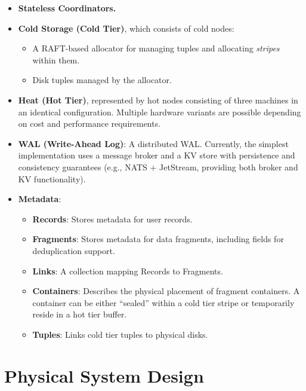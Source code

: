 \documentclass[a4paper,12pt]{article}
\begin{document}
    \begin{itemize}
        \item \textbf{Stateless Coordinators.}

        \item \textbf{Cold Storage (Cold Tier)}, which consists of cold nodes:
        \begin{itemize}
            \item A RAFT-based allocator for managing tuples and allocating \textit{stripes} within them.
            \item Disk tuples managed by the allocator.
        \end{itemize}

        \item \textbf{Heat (Hot Tier)}, represented by hot nodes consisting of three machines in an identical configuration. Multiple hardware variants are possible depending on cost and performance requirements.

        \item \textbf{WAL (Write-Ahead Log)}: A distributed WAL. Currently, the simplest implementation uses a message broker and a KV store with persistence and consistency guarantees (e.g., NATS + JetStream, providing both broker and KV functionality).

        \item \textbf{Metadata}:
        \begin{itemize}
            \item \textbf{Records}: Stores metadata for user records.
            \item \textbf{Fragments}: Stores metadata for data fragments, including fields for deduplication support.
            \item \textbf{Links}: A collection mapping Records to Fragments.
            \item \textbf{Containers}: Describes the physical placement of fragment containers. A container can be either \enquote{sealed} within a cold tier stripe or temporarily reside in a hot tier buffer.
            \item \textbf{Tuples}: Links cold tier tuples to physical disks.
        \end{itemize}
    \end{itemize}


    \newpage


    \section{Physical System Design}
\end{document}

